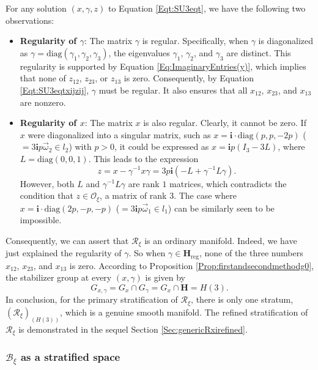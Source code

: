 \documentclass[12pt]{amsart}
\theoremstyle{definition}
\numberwithin{equation}{section}
\def\diag{\mathrm{diag}}
\newcommand{\imagunit}{\mathbf{i}}
\newcommand{\Oxi}{\mathcal{O}_{\xi}}
\newcommand{\Reducedxi}{\mathcal{R}_\xi}
\newcommand{\Bxi}{\mathcal{B}_{\xi}}
\newcommand{\Hreg}{\Cartan_{\mathrm{reg}}}
\newcommand{\Cartan}{\mathbf{H}}
\begin{document}
For any solution $(x, \gamma, z)$ to Equation \eqref{Eqt:SU3eqt}, we have the following two observations: \begin{itemize}
	\item[--]   \textbf{Regularity of $\gamma$}:  The matrix $\gamma$ is regular. Specifically, when $\gamma$ is diagonalized as $\gamma = \diag(\gamma_1, \gamma_2, \gamma_3)$, the eigenvalues $\gamma_1$, $\gamma_2$, and $\gamma_3$ are distinct. This regularity is supported by Equation \eqref{Eq:ImaginaryEntries(y)}, which implies that none of $z_{12}$, $z_{23}$, or $z_{13}$ is zero. Consequently, by Equation \eqref{Eqt:SU3eqtxijzij}, $\gamma$ must be regular. It also ensures that all $x_{12}$, $x_{23}$, and $x_{13}$ are nonzero.
	
	\item[--]   \textbf{Regularity of $x$}:  The matrix $x$ is also regular. Clearly, it cannot be zero. If $x$ were diagonalized into a singular matrix, such as $x =  \imagunit\cdot \diag(p , p   , -2p   )$ ($=3\imagunit p \vec{\omega}_2\in l_2$) with $p > 0$,  it could be expressed as $x = \imagunit p (I_3 - 3L)$, where $L = \diag(0, 0, 1)$. This leads to the expression $$z = x - {\gamma^{-1}}x\gamma = 3p\imagunit  (-L + \gamma^{-1} L \gamma).$$ However, both $L$ and $\gamma^{-1} L \gamma$ are rank $1$ matrices, which contradicts the condition that $z \in \Oxi$, a matrix of rank $3$. The case where $x= \imagunit\cdot \diag(2p , -p   , - p   )$ ($=3\imagunit p \vec{\omega}_1\in l_1$) can be similarly seen to be impossible.
	
\end{itemize}

 


Consequently, we can assert that $\Reducedxi$ is an ordinary manifold. Indeed, we have just explained the regularity of $\gamma$. So when $\gamma\in \Hreg$,     none of the three numbers $x_{12}$, $x_{23}$, and $x_{13}$ is zero.  According to Proposition \ref{Prop:firstandsecondmethodg0}, the stabilizer group at every $(x,\gamma)$ is given by 
$$
G_{x,\gamma} = G_x \cap G_\gamma = G_x \cap \Cartan = H(3)  .
$$   In conclusion, for the primary stratification of $\Reducedxi$, there is only one stratum, $(\Reducedxi)_{(H(3))}$, which is a genuine smooth manifold. The refined stratification of $\Reducedxi$ is demonstrated in the sequel Section \ref{Sec:genericRxirefined}.


\subsubsection{$\Bxi  $      as a stratified space}  \label{Sec:Bxipolyarea}
 
\end{document}
